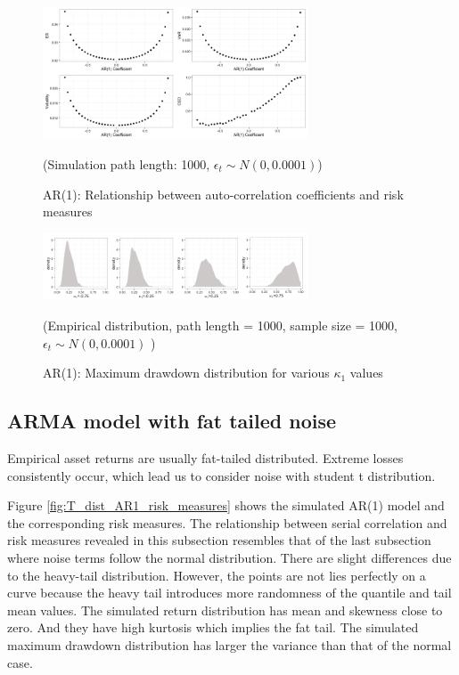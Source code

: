 \documentclass[11pt]{article}
\begin{document}
\begin{figure}[H]
\centering
\includegraphics[width = 0.7\textwidth]{../figures/simulation/AR1_risk_measures}
\caption{AR(1): Relationship between auto-correlation coefficients and risk measures}
(Simulation path length: 1000, $\epsilon_t \sim N(0, 0.0001)$)
\label{fig:AR1_risk_measures}
\end{figure}

\begin{figure}[H]
\centering
\includegraphics[width = 0.7\textwidth]{../figures/simulation/AR1_maxDrawdown_dist_re}
\caption{AR(1): Maximum drawdown distribution for various $\kappa_1$ values }
(Empirical distribution, path length = 1000, sample size = 1000, $\epsilon_t \sim N(0, 0.0001)$ )
\label{fig:AR1_maxDrawdown_dist}
\end{figure}

\subsection{ARMA model with fat tailed noise}

Empirical asset returns are usually fat-tailed distributed. Extreme losses consistently occur, which lead us to consider noise with student t distribution.

Figure \ref{fig:T_dist_AR1_risk_measures} shows the simulated AR(1) model and the corresponding risk measures. The relationship between serial correlation and risk measures revealed in this subsection resembles that of the last subsection where noise terms follow the normal distribution. There are slight differences due to the heavy-tail distribution. However, the points are not lies perfectly on a curve because the heavy tail introduces more randomness of the quantile and tail mean values. The simulated return distribution has mean and skewness close to zero. And they have high kurtosis which implies the fat tail. The simulated maximum drawdown distribution has larger the variance than that of the normal case.
\end{document}
